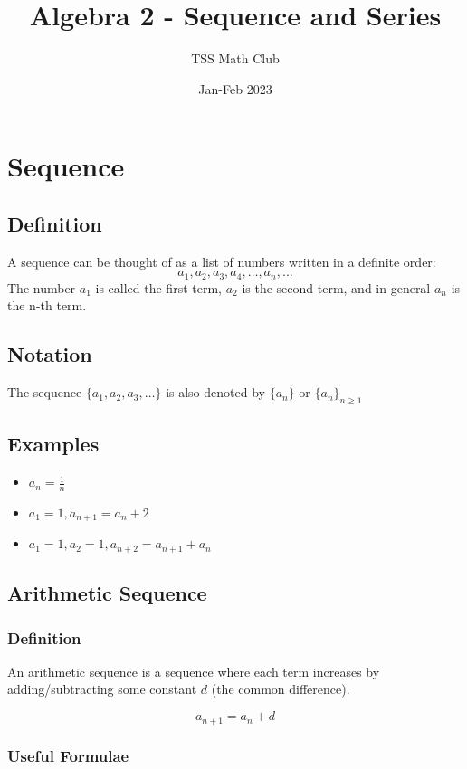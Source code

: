 \documentclass{article}
\title{Algebra 2 - Sequence and Series}
\author{TSS Math Club}
\date{Jan-Feb 2023}
\begin{document}
\large

\maketitle

\section{Sequence}

\subsection{Definition}
A sequence can be thought of as a list of numbers written in a definite order:
$$a_1, a_2, a_3, a_4,\dots , a_n, \dots$$
The number $a_1$ is called the first term, $a_2$ is the second term, and in general $a_n$ is the n-th
term.

\subsection{Notation}
The sequence $\{a_1, a_2, a_3, \dots\}$ is also denoted by $\{a_n\}$ or $\{a_n\}_{n \ge 1}$


\subsection{Examples}

\begin{itemize}
    \item $a_n = \frac{1}{n}$
    \item $a_1 = 1, a_{n+1}=a_{n}+2$
    \item $a_1=1, a_2=1, a_{n+2}=a_{n+1}+a_{n} $
\end{itemize}


\subsection{Arithmetic Sequence}

\subsubsection{Definition}

An arithmetic sequence is a sequence where each term increases by adding/subtracting some constant $d$ (the common difference).

$$a_{n+1}=a_{n}+d$$

\subsubsection{Useful Formulae}
\end{document}
